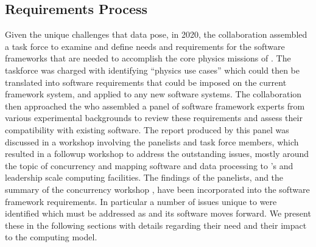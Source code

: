 \documentclass[../main-v1.tex]{subfiles}
\begin{document}

\subsection{Requirements Process} \label{sec:req:proc}

Given the unique challenges that  data pose, in 2020, the collaboration assembled a task force to examine and define needs and requirements for the  software frameworks that are needed to accomplish the core physics missions of .  The taskforce was charged with identifying ``physics use cases''  which could then be translated into software requirements that could be imposed on the current framework system, and applied to any new software systems\cite{bib:docdb21934}.  The collaboration then approached the  who assembled a panel of software framework experts from various experimental backgrounds to review these requirements and assess their compatibility with existing  software. The report \cite{bib:docdb24423} produced by this panel was discussed in a workshop involving the panelists and task force members, which resulted in a followup workshop to address the outstanding issues, mostly around the topic of concurrency and mapping  software and data processing to 's and leadership scale computing facilities.  The findings of the panelists, and the summary of the concurrency workshop \cite{bib:docdb24426}, have been incorporated into the  software framework requirements.  In particular a number of issues unique to  were identified which must be addressed as  and its software moves forward.  We present these in the following sections with details regarding their need and their impact to the  computing model.
\end{document}
